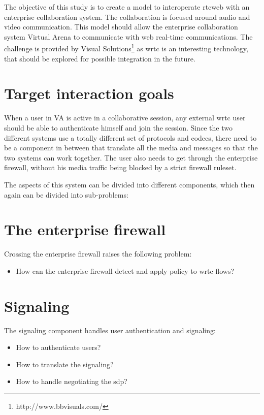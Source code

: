 
The objective of this study is to create a model to interoperate \gls{rtcweb} with an enterprise collaboration system. The collaboration is focused around audio and video communication. This model should allow the enterprise collaboration system Virtual Arena to communicate with web real-time communications. The challenge is provided by Visual Solutions\footnote{http://www.bbvisuals.com/} as \gls{wrtc} is an interesting technology, that should be explored for possible integration in the future.

\section{Target interaction goals}
When a user in VA is active in a collaborative session, any external \gls{wrtc} user should be able to authenticate himself and join the session. Since the two different systems use a totally different set of protocols and codecs, there need to be a component in between that translate all the media and messages so that the two systems can work together. The user also needs to get through the enterprise firewall, without his media traffic being blocked by a strict firewall ruleset.

The aspects of this system can be divided into different components, which then again can be divided into sub-problems:

\section{The enterprise firewall}
Crossing the enterprise firewall raises the following problem:
\begin{itemize}
\item{How can the enterprise firewall detect and apply policy to \gls{wrtc} flows?}
\end{itemize}

\section{Signaling}
The signaling component handles user authentication and signaling:
\begin{itemize}
\item{How to authenticate users?}
\item{How to translate the signaling?}
\item{How to handle negotiating the \gls{sdp}?}
\end{itemize}

